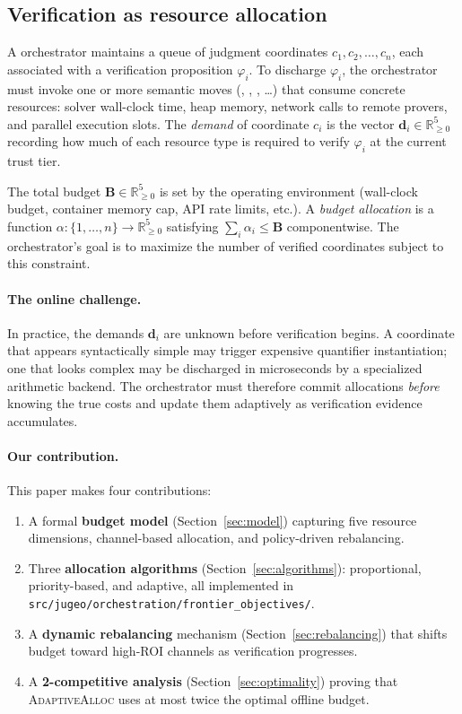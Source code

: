 \documentclass[11pt]{article}
\providecommand{\Bvec}{\mathbf{B}}             %
\providecommand{\Alloc}{\alpha}                %
\providecommand{\Demand}{\mathbf{d}}           %
\providecommand{\AdaptAlloc}{\textsc{AdaptiveAlloc}}   %
\begin{document}
\subsection{Verification as resource allocation}

A \JuGeo{} orchestrator maintains a queue of judgment coordinates
$c_1, c_2, \ldots, c_n$, each associated with a verification
proposition $\varphi_i$.  To discharge $\varphi_i$, the orchestrator
must invoke one or more semantic moves (\VERIFY, \CONSTRUCT,
\NORMALIZE, \ldots) that consume concrete resources: solver wall-clock
time, heap memory, network calls to remote provers, and parallel
execution slots.  The \emph{demand} of coordinate $c_i$ is the vector
$\Demand_i \in \mathbb{R}_{\ge 0}^5$ recording how much of each
resource type is required to verify $\varphi_i$ at the current trust
tier.

The total budget $\Bvec \in \mathbb{R}_{\ge 0}^5$ is set by the
operating environment (wall-clock budget, container memory cap, API
rate limits, etc.).  A \emph{budget allocation} is a function
$\Alloc : \{1,\ldots,n\} \to \mathbb{R}_{\ge 0}^5$ satisfying
$\sum_i \Alloc_i \le \Bvec$ componentwise.  The orchestrator's goal
is to maximize the number of verified coordinates subject to this
constraint.

\paragraph{The online challenge.}
In practice, the demands $\Demand_i$ are unknown before verification
begins.  A coordinate that appears syntactically simple may trigger
expensive quantifier instantiation; one that looks complex may be
discharged in microseconds by a specialized arithmetic backend.  The
orchestrator must therefore commit allocations \emph{before} knowing
the true costs and update them adaptively as verification
evidence accumulates.

\paragraph{Our contribution.}
This paper makes four contributions:
\begin{enumerate}[label=(\roman*)]
  \item A formal \textbf{budget model} (Section~\ref{sec:model})
    capturing five resource dimensions, channel-based allocation,
    and policy-driven rebalancing.
  \item Three \textbf{allocation algorithms}
    (Section~\ref{sec:algorithms}): proportional, priority-based,
    and adaptive, all implemented in
    \texttt{src/jugeo/orchestration/frontier\_objectives/}.
  \item A \textbf{dynamic rebalancing} mechanism
    (Section~\ref{sec:rebalancing}) that shifts budget toward
    high-ROI channels as verification progresses.
  \item A \textbf{2-competitive analysis}
    (Section~\ref{sec:optimality}) proving that \AdaptAlloc{}
    uses at most twice the optimal offline budget.
\end{enumerate}
\end{document}
